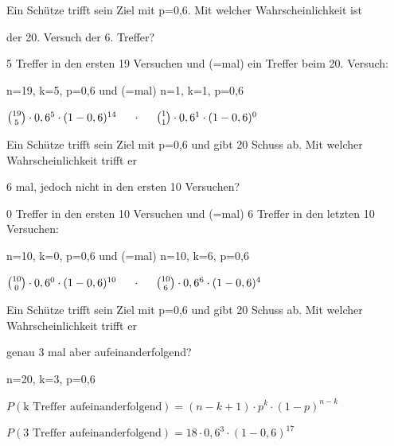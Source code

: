 \documentclass[paper=a6,landscape,ngerman,twoside=true,fontsize=12pt]{scrartcl}
\begin{document}
\begin{frage}
	\large
	Ein Schütze trifft sein Ziel mit p=0,6. Mit welcher Wahrscheinlichkeit ist 
	
	\LARGE 
	der 20. Versuch der 6. Treffer?
	
\end{frage}
\begin{antwort}
	5 Treffer in den ersten 19 Versuchen und (=mal) ein Treffer beim 20. Versuch:
	
	n=19, k=5, p=0,6 und (=mal) n=1, k=1, p=0,6
	
	\bigskip
	$\binom{19}{5} \cdot 0,6^{5} \cdot (1-0,6)^{14} \hspace*{0.5cm}\cdot\hspace*{0.5cm} \binom{1}{1} \cdot 0,6^{1} \cdot (1-0,6)^{0}$
		
\end{antwort}
\begin{frage}
	\large
	Ein Schütze trifft sein Ziel mit p=0,6 und gibt 20 Schuss ab. Mit welcher Wahrscheinlichkeit trifft er  
	
	\LARGE 
	6 mal, jedoch nicht in den ersten 10 Versuchen?
	
\end{frage}
\begin{antwort}
	0 Treffer in den ersten 10 Versuchen und (=mal) 6 Treffer in den letzten 10 Versuchen:
	
	n=10, k=0, p=0,6 und (=mal) n=10, k=6, p=0,6
	
	\bigskip
	$\binom{10}{0} \cdot 0,6^{0} \cdot (1-0,6)^{10} \hspace*{0.5cm}\cdot\hspace*{0.5cm} \binom{10}{6} \cdot 0,6^{6} \cdot (1-0,6)^{4}$
	
\end{antwort}
\begin{frage}
	\large
	Ein Schütze trifft sein Ziel mit p=0,6 und gibt 20 Schuss ab. Mit welcher Wahrscheinlichkeit trifft er 
	
	\LARGE 
	genau 3 mal aber aufeinanderfolgend?
	
\end{frage}
\begin{antwort}
	n=20, k=3, p=0,6
	
	\bigskip
	$P(\text{k Treffer aufeinanderfolgend})=(n-k+1)\cdot p^{k} \cdot (1-p)^{n-k}$
	
	$P(\text{3 Treffer aufeinanderfolgend})=18\cdot 0,6^{3} \cdot (1-0,6)^{17}$
	
\end{antwort}
\end{document}
